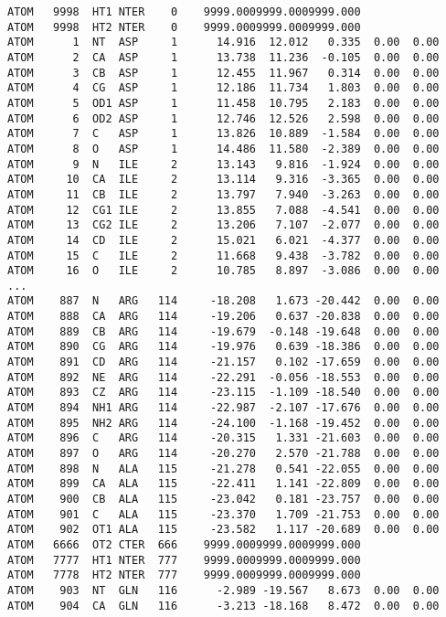 \begin{verbatim}
ATOM   9998  HT1 NTER    0    9999.0009999.0009999.000
ATOM   9998  HT2 NTER    0    9999.0009999.0009999.000
ATOM      1  NT  ASP     1      14.916  12.012   0.335  0.00  0.00
ATOM      2  CA  ASP     1      13.738  11.236  -0.105  0.00  0.00
ATOM      3  CB  ASP     1      12.455  11.967   0.314  0.00  0.00
ATOM      4  CG  ASP     1      12.186  11.734   1.803  0.00  0.00
ATOM      5  OD1 ASP     1      11.458  10.795   2.183  0.00  0.00
ATOM      6  OD2 ASP     1      12.746  12.526   2.598  0.00  0.00
ATOM      7  C   ASP     1      13.826  10.889  -1.584  0.00  0.00
ATOM      8  O   ASP     1      14.486  11.580  -2.389  0.00  0.00
ATOM      9  N   ILE     2      13.143   9.816  -1.924  0.00  0.00
ATOM     10  CA  ILE     2      13.114   9.316  -3.365  0.00  0.00
ATOM     11  CB  ILE     2      13.797   7.940  -3.263  0.00  0.00
ATOM     12  CG1 ILE     2      13.855   7.088  -4.541  0.00  0.00
ATOM     13  CG2 ILE     2      13.206   7.107  -2.077  0.00  0.00
ATOM     14  CD  ILE     2      15.021   6.021  -4.377  0.00  0.00
ATOM     15  C   ILE     2      11.668   9.438  -3.782  0.00  0.00
ATOM     16  O   ILE     2      10.785   8.897  -3.086  0.00  0.00
...
ATOM    887  N   ARG   114     -18.208   1.673 -20.442  0.00  0.00
ATOM    888  CA  ARG   114     -19.206   0.637 -20.838  0.00  0.00
ATOM    889  CB  ARG   114     -19.679  -0.148 -19.648  0.00  0.00
ATOM    890  CG  ARG   114     -19.976   0.639 -18.386  0.00  0.00
ATOM    891  CD  ARG   114     -21.157   0.102 -17.659  0.00  0.00
ATOM    892  NE  ARG   114     -22.291  -0.056 -18.553  0.00  0.00
ATOM    893  CZ  ARG   114     -23.115  -1.109 -18.540  0.00  0.00
ATOM    894  NH1 ARG   114     -22.987  -2.107 -17.676  0.00  0.00
ATOM    895  NH2 ARG   114     -24.100  -1.168 -19.452  0.00  0.00
ATOM    896  C   ARG   114     -20.315   1.331 -21.603  0.00  0.00
ATOM    897  O   ARG   114     -20.270   2.570 -21.788  0.00  0.00
ATOM    898  N   ALA   115     -21.278   0.541 -22.055  0.00  0.00
ATOM    899  CA  ALA   115     -22.411   1.141 -22.809  0.00  0.00
ATOM    900  CB  ALA   115     -23.042   0.181 -23.757  0.00  0.00
ATOM    901  C   ALA   115     -23.370   1.709 -21.753  0.00  0.00
ATOM    902  OT1 ALA   115     -23.582   1.117 -20.689  0.00  0.00
ATOM   6666  OT2 CTER  666    9999.0009999.0009999.000
ATOM   7777  HT1 NTER  777    9999.0009999.0009999.000
ATOM   7778  HT2 NTER  777    9999.0009999.0009999.000
ATOM    903  NT  GLN   116      -2.989 -19.567   8.673  0.00  0.00
ATOM    904  CA  GLN   116      -3.213 -18.168   8.472  0.00  0.00

\end{verbatim}
